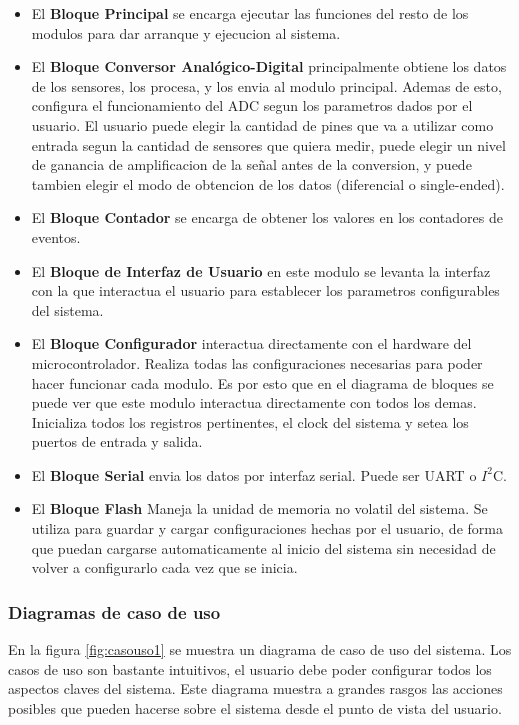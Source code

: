 \begin{itemize}
  \item El \textbf{Bloque Principal} se encarga ejecutar las funciones del resto de los modulos para dar arranque y ejecucion al sistema.
  \item El \textbf{Bloque Conversor Anal\'ogico-Digital} principalmente obtiene los datos de los sensores, los procesa, y los envia al modulo principal. Ademas de esto, configura el funcionamiento del ADC segun los parametros dados por el usuario. El usuario puede elegir la cantidad de pines que va a utilizar como entrada segun la cantidad de sensores que quiera medir, puede elegir un nivel de ganancia de amplificacion de la se\~nal antes de la conversion, y puede tambien elegir el modo de obtencion de los datos (diferencial o single-ended).
  \item El \textbf{Bloque Contador} se encarga de obtener los valores en los contadores de eventos.
  \item El \textbf{Bloque de Interfaz de Usuario} en este modulo se levanta la interfaz con la que interactua el usuario para establecer los parametros configurables del sistema.
  \item El \textbf{Bloque Configurador} interactua directamente con el hardware del microcontrolador. Realiza todas las configuraciones necesarias para poder hacer funcionar cada modulo. Es por esto que en el diagrama de bloques se puede ver que este modulo interactua directamente con todos los demas. Inicializa todos los registros pertinentes, el clock del sistema y setea los puertos de entrada y salida.
  \item El \textbf{Bloque Serial} envia los datos por interfaz serial. Puede ser UART o $I^{2}$C.
  \item El \textbf{Bloque Flash} Maneja la unidad de memoria no volatil del sistema. Se utiliza para guardar y cargar configuraciones hechas por el usuario, de forma que puedan cargarse automaticamente al inicio del sistema sin necesidad de volver a configurarlo cada vez que se inicia.
\end{itemize}

\subsubsection{Diagramas de caso de uso}
En la figura \ref{fig:casouso1} se muestra un diagrama de caso de uso del sistema. Los casos de uso son bastante intuitivos, el usuario debe poder configurar todos los aspectos claves del sistema. Este diagrama muestra a grandes rasgos las acciones posibles que pueden hacerse sobre el sistema desde el punto de vista del usuario.


